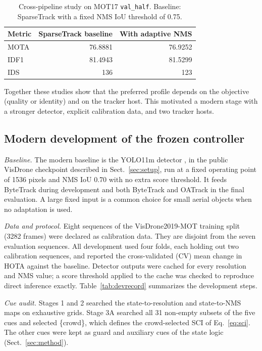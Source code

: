 \begin{table}[t]
\caption{Cross-pipeline study on MOT17 \texttt{val\_half}. Baseline:
SparseTrack with a fixed NMS IoU threshold of 0.75.}
\label{tab:sparsetrack}
\centering\footnotesize
\setlength{\tabcolsep}{4pt}
\begin{tabular}{@{}lrr@{}}
\toprule
Metric & SparseTrack baseline & With adaptive NMS\\
\midrule
MOTA & 76.8881 & 76.9252\\
IDF1 & 81.4943 & 81.5299\\
IDS & 136 & 123\\
\bottomrule
\end{tabular}
\end{table}

Together these studies show that the preferred profile depends on the
objective (quality or identity) and on the tracker host. This motivated a
modern stage with a stronger detector, explicit calibration data, and two
tracker hosts.

\subsection{Modern development of the frozen controller}\label{sec:modern}

\emph{Baseline.} The modern baseline is the YOLO11m detector
\cite{jocher2024yolo11}, in the public VisDrone checkpoint described in
Sect.~\ref{sec:setup}, run at a fixed operating point of 1536 pixels and NMS
IoU 0.70 with no extra score threshold. It feeds ByteTrack
\cite{zhang2022bytetrack} during development and both ByteTrack and OATrack
\cite{qi2026oatrack} in the final evaluation. A large fixed input is a common
choice for small aerial objects when no adaptation is used.

\emph{Data and protocol.} Eight sequences of the VisDrone2019-MOT training split
(3282 frames) were declared as calibration data. They are disjoint from the
seven evaluation sequences. All development used four folds, each holding out
two calibration sequences, and reported the cross-validated (CV) mean change
in HOTA against the baseline. Detector outputs were cached for every
resolution and NMS value; a score threshold applied to the cache was checked
to reproduce direct inference exactly. Table~\ref{tab:devrecord} summarizes
the development steps.

\emph{Cue audit.} Stages 1 and 2 searched the state-to-resolution and
state-to-NMS maps on exhaustive grids. Stage 3A searched all 31 non-empty
subsets of the five cues and selected \{crowd\}, which defines the
crowd-selected SCI of Eq.~\eqref{eq:sci}. The other cues were kept as guard and
auxiliary cues of the state logic (Sect.~\ref{sec:method}).


